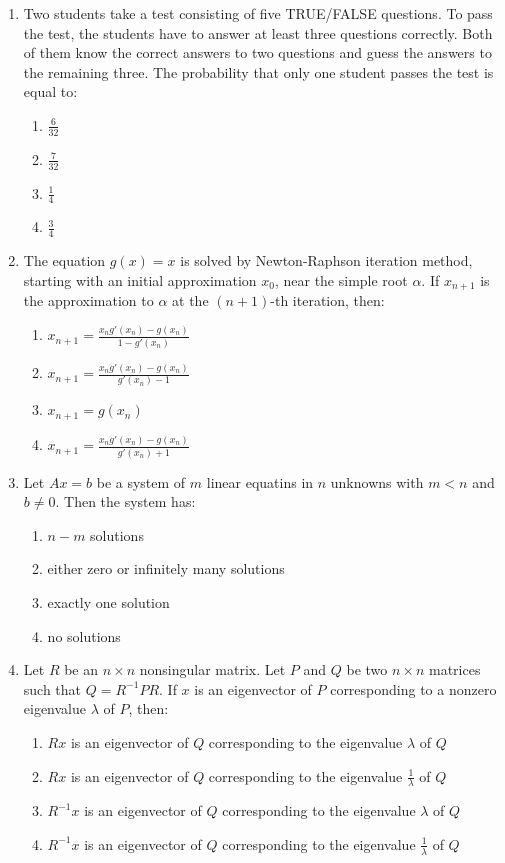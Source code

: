 \documentclass[journal,12pt,onecolumn]{IEEEtran}
\theoremstyle{remark}
\begin{document}
\begin{enumerate}
\item Two students take a test consisting of five TRUE/FALSE questions. To pass the test, the students have to answer at least three questions correctly. Both of them know the correct answers to two questions and guess the answers to the remaining three. The probability that only one student passes the test is equal to:
    \begin{enumerate}
        \item $ \frac{6}{32} $
        \item $ \frac{7}{32} $
        \item $ \frac{1}{4} $
        \item $ \frac{3}{4} $
    \end{enumerate}
  
\item The equation $g(x) = x$ is solved by Newton-Raphson iteration method, starting with an initial approximation $x_0$, near the simple root $\alpha$. If $x_{n+1}$ is the approximation to $\alpha$ at the $(n+1)$-th iteration, then:
\begin{enumerate}
    \item $x_{n+1} = \frac{x_n g'(x_n) - g(x_n)}{1 - g'(x_n)}$
    \item $x_{n+1} = \frac{x_n g'(x_n) - g(x_n)}{g'(x_n) - 1}$
    \item $x_{n+1} = g(x_n)$
    \item $x_{n+1} = \frac{x_n g'(x_n) - g(x_n)}{g'(x_n) + 1}$
\end{enumerate}
\item Let $Ax = b$ be a system of $m$ linear equatins in $n$ unknowns with $m < n$ and $b \neq 0$. Then the system has:
\begin{enumerate}
    \item $n - m$ solutions
    \item either zero or infinitely many solutions
    \item exactly one solution
    \item no solutions
\end{enumerate}

\item Let $R$ be an $n \times n$ nonsingular matrix. Let $P$ and $Q$ be two $n \times n$ matrices such that $Q = R^{-1} P R$. If $x$ is an eigenvector of $P$ corresponding to a nonzero eigenvalue $\lambda$ of $P$, then:
\begin{enumerate}
    \item $R x$ is an eigenvector of $Q$ corresponding to the eigenvalue $\lambda$ of $Q$
    \item $R x$ is an eigenvector of $Q$ corresponding to the eigenvalue $\frac{1}{\lambda}$ of $Q$
    \item $R^{-1} x$ is an eigenvector of $Q$ corresponding to the eigenvalue $\lambda$ of $Q$
    \item $R^{-1} x$ is an eigenvector of $Q$ corresponding to the eigenvalue $\frac{1}{\lambda}$ of $Q$
\end{enumerate}


\end{enumerate}
\end{document}
